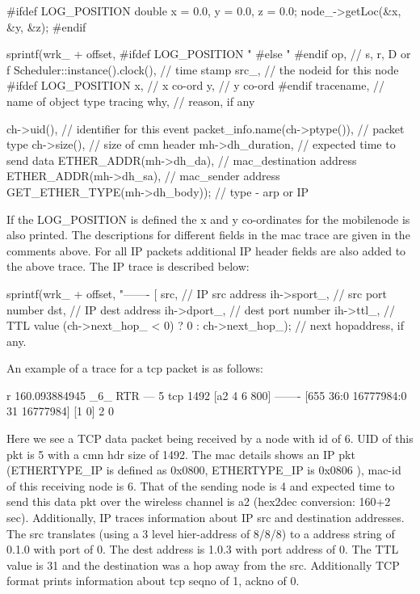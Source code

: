 \begin{program}
\#ifdef LOG_POSITION
        double x = 0.0, y = 0.0, z = 0.0;
        node_->getLoc(&x, &y, &z);
\#endif

	sprintf(wrk_ + offset,
\#ifdef LOG_POSITION
		"%
\#else
		"%
\#endif
		op,                    // s, r, D or f
		Scheduler::instance().clock(),  // time stamp
                src_,                  // the nodeid for this node
\#ifdef LOG_POSITION
                x,                     // x co-ord 
                y,                     // y co-ord
\#endif
		tracename,             // name of object type tracing
		why,                   // reason, if any

                ch->uid(),             // identifier for this event
		packet_info.name(ch->ptype()), // packet type
		ch->size(),                    // size of cmn header
		mh->dh_duration,       // expected time to send data 
		ETHER_ADDR(mh->dh_da), // mac_destination address
		ETHER_ADDR(mh->dh_sa),         // mac_sender address
		GET_ETHER_TYPE(mh->dh_body));  // type - arp or IP
\end{program}

If the LOG\_POSITION is defined the x and y co-ordinates for the mobilenode is also printed. The descriptions for different fields in the mac trace are given in the comments above. For all IP packets additional IP header fields are also added to the above trace. The IP trace is described below:
\begin{program}
sprintf(wrk_ + offset, "------- [%
		src,          // IP src address
		ih->sport_,   // src port number
		dst,          // IP dest address
		ih->dport_,   // dest port number
		ih->ttl_,     // TTL value 
		(ch->next_hop_ < 0) ? 0 : ch->next_hop_); // next hopaddress, if any.
\end{program}

An example of a trace for a tcp packet is as follows:
\begin{program}
r 160.093884945 _6_ RTR  --- 5 tcp 1492 [a2 4 6 800] ------- [655
36:0 16777984:0 31 16777984] [1 0] 2 0
\end{program}
Here we see a TCP data packet being received by a node with id of 6. UID of this pkt is 5 with a cmn hdr size of 1492. The mac details shows an IP pkt (ETHERTYPE\_IP is defined as 0x0800, ETHERTYPE\_IP is 0x0806 ), mac-id of this receiving node is 6. That of the sending node is 4 and expected time to send this data pkt over the wireless channel is a2 (hex2dec conversion: 160+2 sec). Additionally, IP traces information about IP src and destination addresses. The src translates (using a 3 level hier-address of 8/8/8) to a address string of 0.1.0 with port of 0. The dest address is 1.0.3 with port address of 0. The TTL value is 31 and the destination was a hop away from the src. Additionally TCP format prints information about tcp seqno of 1, ackno of 0. 

